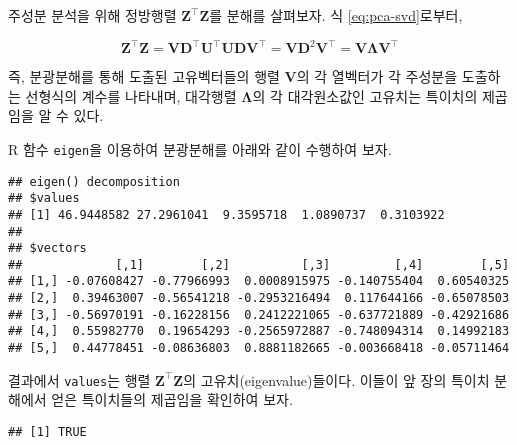 \documentclass[]{book}
\newenvironment{Shaded}{\begin{snugshade}}{\end{snugshade}}
\newcommand{\DataTypeTok}[1]{\textcolor[rgb]{0.13,0.29,0.53}{#1}}
\newcommand{\DecValTok}[1]{\textcolor[rgb]{0.00,0.00,0.81}{#1}}
\newcommand{\KeywordTok}[1]{\textcolor[rgb]{0.13,0.29,0.53}{\textbf{#1}}}
\newcommand{\NormalTok}[1]{#1}
\newcommand{\OperatorTok}[1]{\textcolor[rgb]{0.81,0.36,0.00}{\textbf{#1}}}
\newcommand{\OtherTok}[1]{\textcolor[rgb]{0.56,0.35,0.01}{#1}}
\newcommand{\StringTok}[1]{\textcolor[rgb]{0.31,0.60,0.02}{#1}}
\begin{document}
주성분 분석을 위해 정방행렬 \(\mathbf{Z}^\top \mathbf{Z}\)를 분해를 살펴보자. 식 \eqref{eq:pca-svd}로부터,

\[
\mathbf{Z}^\top \mathbf{Z} = \mathbf{V} \mathbf{D}^\top \mathbf{U}^\top \mathbf{U} \mathbf{D} \mathbf{V}^\top = \mathbf{V} \mathbf{D}^2 \mathbf{V}^\top = \mathbf{V} \mathbf{\Lambda} \mathbf{V}^\top
\]

즉, 분광분해를 통해 도출된 고유벡터들의 행렬 \(\mathbf{V}\)의 각 열벡터가 각 주성분을 도출하는 선형식의 계수를 나타내며, 대각행렬 \(\mathbf{\Lambda}\)의 각 대각원소값인 고유치는 특이치의 제곱임을 알 수 있다.

R 함수 \texttt{eigen}을 이용하여 분광분해를 아래와 같이 수행하여 보자.

\begin{Shaded}
\end{Shaded}

\begin{verbatim}
## eigen() decomposition
## $values
## [1] 46.9448582 27.2961041  9.3595718  1.0890737  0.3103922
## 
## $vectors
##             [,1]        [,2]          [,3]         [,4]        [,5]
## [1,] -0.07608427 -0.77966993  0.0008915975 -0.140755404  0.60540325
## [2,]  0.39463007 -0.56541218 -0.2953216494  0.117644166 -0.65078503
## [3,] -0.56970191 -0.16228156  0.2412221065 -0.637721889 -0.42921686
## [4,]  0.55982770  0.19654293 -0.2565972887 -0.748094314  0.14992183
## [5,]  0.44778451 -0.08636803  0.8881182665 -0.003668418 -0.05711464
\end{verbatim}

결과에서 \texttt{values}는 행렬 \(\mathbf{Z}^\top \mathbf{Z}\)의 고유치(eigenvalue)들이다. 이들이 앞 장의 특이치 분해에서 얻은 특이치들의 제곱임을 확인하여 보자.

\begin{Shaded}
\end{Shaded}

\begin{verbatim}
## [1] TRUE
\end{verbatim}
\end{document}
